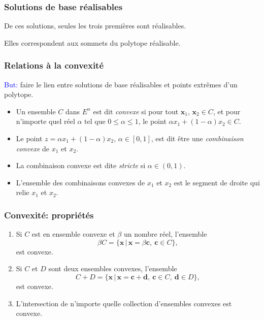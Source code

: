 \documentclass[usepdftitle=false]{beamer}
\def\bc{\boldsymbol{c}}
\def\bd{\boldsymbol{d}}
\def\bx{\boldsymbol{x}}
\begin{document}
\begin{frame}
\frametitle{Solutions de base réalisables}

De ces solutions, seules les trois premières sont réalisables.

\mbox{}

Elles correspondent aux sommets du polytope réalisable.

\end{frame}

\begin{frame}
\frametitle{Relations à la convexité}

\textcolor{blue}{But:} faire le lien entre solutions de base réalisables et points extrêmes d'un polytope.

\begin{itemize}
	\item
	Un ensemble $C$ dans $E^n$ est dit {\it convexe} si pour tout $\bx_1$, $\bx_2 \in C$, et pour n'importe quel réel $\alpha$ tel que $0 \leq \alpha \leq 1$, le point $\alpha x_1 + (1-\alpha) x_2 \in C$.
	\item
Le point $z = \alpha x_1 + (1-\alpha) x_2$, $\alpha \in [0, 1]$, est dit être une {\it combinaison convexe} de $x_1$ et $x_2$.
	\item
La combinaison convexe est dite {\it stricte} si $\alpha \in (0, 1)$.
	\item
L'ensemble des combinaisons convexes de $x_1$ et $x_2$ est le segment de droite qui relie $x_1$ et $x_2$.
\end{itemize}

\end{frame}

\begin{frame}
\frametitle{Convexité: propriétés}

\begin{enumerate}
	\item
	Si $C$ est en ensemble convexe et $\beta$ un nombre réel, l'ensemble
	\[
	\beta C = \lbrace \bx \,|\, \bx = \beta \bc,\ \bc \in C \rbrace,
	\]
	est convexe.
	\item
	Si $C$ et $D$ sont deux ensembles convexes, l'ensemble
	\[
	C + D = \lbrace \bx \,|\, \bx = \bc + \bd,\ \bc \in C,\ \bd \in D \rbrace,
	\]
	est convexe.
	\item
	L'intersection de n'importe quelle collection d'ensembles convexes est convexe.
\end{enumerate}

\end{frame}
\end{document}
